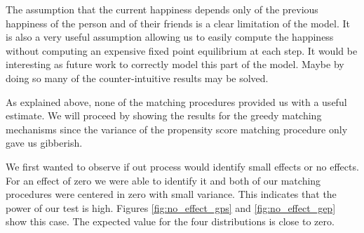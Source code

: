 \documentclass[11pt]{article}
\begin{document}
The assumption that the current happiness depends only of the previous happiness of the person and of their friends is a clear limitation of the model. It is also a very useful assumption allowing us to easily compute the happiness without computing an expensive fixed point equilibrium at each step. It would be interesting as future work to correctly model this part of the model. Maybe by doing so many of the counter-intuitive results may be solved.

As explained above, none of the matching procedures provided us with a useful estimate. We will proceed by showing the results for the greedy matching mechanisms since the variance of the propensity score matching procedure only gave us gibberish.

We first wanted to observe if out process would identify small effects or no effects. For an effect of zero we were able to identify it and both of our matching procedures were centered in zero with small variance. This indicates that the power of our test is high. Figures \ref{fig:no_effect_gps} and \ref{fig:no_effect_gep} show this case. The expected value for the four distributions is close to zero.
\end{document}
